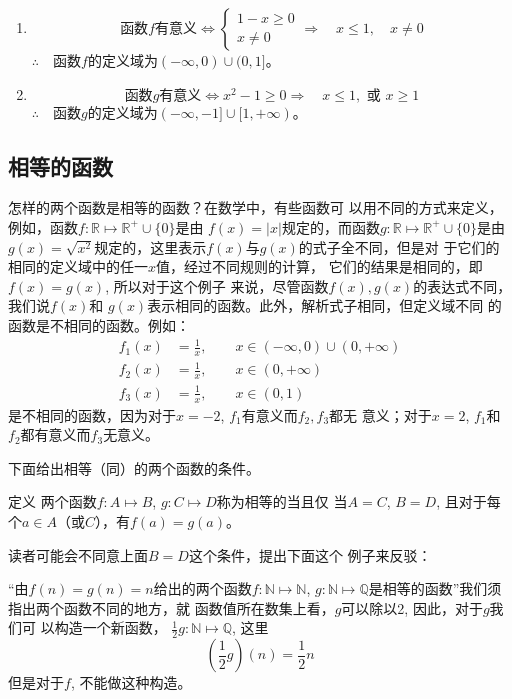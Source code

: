 \begin{solution}
    \begin{enumerate}
        \item \[\text{函数$f$有意义}\Leftrightarrow \begin{cases}
    1-x \ge 0\\
    x\ne 0
\end{cases}\Rightarrow\quad x\le 1, \quad x\ne 0\]
$\therefore\quad $函数$f$的定义域为$(-\infty,0)\cup(0,1]$。

\item \[\text{函数$g$有意义}\Leftrightarrow x^2-1\ge 0 \Rightarrow\quad x\le 1, \text{ 或 } x\ge 1\]
$\therefore\quad $函数$g$的定义域为$(-\infty,-1]\cup[1,+\infty)$。
    \end{enumerate}
\end{solution}

\subsection{相等的函数}
怎样的两个函数是相等的函数？在数学中，有些函数可
以用不同的方式来定义，例如，函数$f:\mathbb{R}\mapsto \mathbb{R}^+\cup\{0\}$是由
$f(x)=|x|$规定的，而函数$g:\mathbb{R}\mapsto \mathbb{R}^+\cup\{0\}$是由$g(x)=\sqrt{x^2}$规定的，这里表示$f(x)$与$g(x)$的式子全不同，但是对
于它们的相同的定义域中的任一$x$值，经过不同规则的计算，
它们的结果是相同的，即$f(x)=g(x)$, 所以对于这个例子
来说，尽管函数$f(x),g(x)$的表达式不同，我们说$f(x)$和
$g(x)$表示相同的函数。此外，解析式子相同，但定义域不同
的函数是不相同的函数。例如：
\[\begin{split}
    f_1(x)&=\frac{1}{x},\qquad x\in (-\infty,0)\cup(0,+\infty)\\
    f_2(x)&=\frac{1}{x},\qquad x\in (0,+\infty)\\
    f_3(x)&=\frac{1}{x},\qquad x\in (0,1)
\end{split}\]
是不相同的函数，因为对于$x=-2$, $f_1$有意义而$f_2,f_3$都无
意义；对于$x=2$, $f_1$和$f_2$都有意义而$f_3$无意义。

下面给出相等（同）的两个函数的条件。

\begin{blk}{定义}
    两个函数$f:A\mapsto B$, $g:C\mapsto D$称为相等的当且仅
    当$A=C$, $B=D$, 且对于每个$a\in  A$（或$C$），有$f(a)=g(a)$。
\end{blk}

读者可能会不同意上面$B=D$这个条件，提出下面这个
例子来反驳：

“由$f(n)=g(n)=n$给出的两个函数$f:\mathbb{N}\mapsto\mathbb{N}$, $g: \mathbb{N}\mapsto \mathbb{Q}$是相等的函数”我们须指出两个函数不同的地方，就
函数值所在数集上看，$g$可以除以2, 因此，对于$g$我们可
以构造一个新函数，
$\frac{1}{2}g:\mathbb{N}\mapsto \mathbb{Q}$, 这里
\[\left(\frac{1}{2}g\right)(n)=\frac{1}{2}n\]
但是对于$f$, 不能做这种构造。

